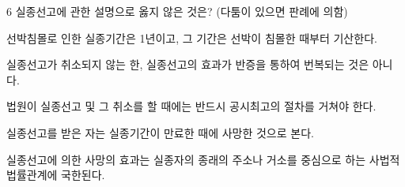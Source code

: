 \begin{question}{6}
실종선고에 관한 설명으로 옳지 않은 것은? (다툼이 있으면 판례에 의함)
\begin{choices}
  \item 선박침몰로 인한 실종기간은 1년이고, 그 기간은 선박이 침몰한 때부터 기산한다.
  \item 실종선고가 취소되지 않는 한, 실종선고의 효과가 반증을 통하여 번복되는 것은 아니다.
  \item 법원이 실종선고 및 그 취소를 할 때에는 반드시 공시최고의 절차를 거쳐야 한다.
  \item 실종선고를 받은 자는 실종기간이 만료한 때에 사망한 것으로 본다.
  \item 실종선고에 의한 사망의 효과는 실종자의 종래의 주소나 거소를 중심으로 하는 사법적 법률관계에 국한된다.
\end{choices}
\end{question}
